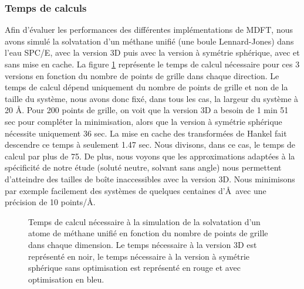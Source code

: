\subsubsection{Temps de calculs}
Afin d'évaluer les performances des différentes implémentations de MDFT, nous avons simulé la solvatation d'un méthane unifié (une boule Lennard-Jones) dans l'eau SPC/E, avec la version 3D puis avec la version à symétrie sphérique, avec et sans mise en cache.
La figure \ref{fig:temps_calcul_methane_versions} représente le temps de calcul nécessaire pour ces 3 versions en fonction du nombre de points de grille dans chaque direction.
Le temps de calcul dépend uniquement du nombre de points de grille et non de la taille du système, nous avons donc fixé, dans tous les cas, la largeur du système à 20 \AA.
Pour 200 points de grille, on voit que la version 3D a besoin de 1 min 51 sec pour compléter la minimisation, alors que la version à symétrie sphérique nécessite uniquement 36 sec.
La mise en cache des transformées de Hankel fait descendre ce temps à seulement 1.47 sec.
Nous divisons, dans ce cas, le temps de calcul par plus de 75.
De plus, nous voyons que les approximations adaptées à la spécificité de notre étude (soluté neutre, solvant sans angle) nous permettent d'atteindre des tailles de boîte inaccessibles avec la version 3D.
Nous minimisons par exemple facilement des systèmes de quelques centaines d'\AA\ avec une précision de 10 points/\AA.



\begin{figure}[H]
  \centering
  \caption[Temps de calcul nécessaire à la simulation de la solvatation d'un atome de méthane unifié.]{Temps de calcul nécessaire à la simulation de la solvatation d'un atome de méthane unifié en fonction du nombre de points de grille dans chaque dimension. Le temps nécessaire à la version 3D est représenté en noir, le temps nécessaire à la version à symétrie sphérique sans optimisation est représenté en rouge et avec optimisation en bleu.}
  \label{fig:temps_calcul_methane_versions}
\end{figure}

